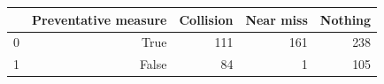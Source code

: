 \begin{tabular}{lrrrr}
\toprule
 & Preventative measure & Collision & Near miss & Nothing \\
\midrule
0 & True & 111 & 161 & 238 \\
1 & False & 84 & 1 & 105 \\
\bottomrule
\end{tabular}
